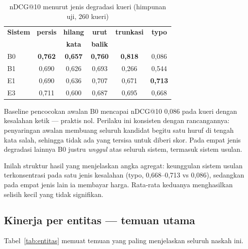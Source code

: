 \documentclass[journal,twoside,web]{ieeecolor}
\begin{document}
\begin{table}[!t]
\caption{nDCG@10 menurut jenis degradasi kueri (himpunan uji, 260 kueri)}
\label{tab:tipe}
\centering
\footnotesize
\begin{tabular}{@{}lccccc@{}}
\toprule
\textbf{Sistem} & \textbf{persis} & \textbf{hilang} & \textbf{urut} &
\textbf{trunkasi} & \textbf{typo} \\
 & & \textbf{kata} & \textbf{balik} & & \\
\midrule
B0 & \textbf{0,762} & \textbf{0,657} & \textbf{0,760} & \textbf{0,818} & 0,086 \\
B1 & 0,690 & 0,626 & 0,693 & 0,266 & 0,544 \\
E1 & 0,690 & 0,636 & 0,707 & 0,671 & \textbf{0,713} \\
E3 & 0,711 & 0,600 & 0,687 & 0,695 & 0,668 \\
\bottomrule
\end{tabular}
\end{table}

Baseline pencocokan awalan B0 mencapai nDCG@10 0,086 pada kueri dengan kesalahan
ketik --- praktis nol. Perilaku ini konsisten dengan rancangannya: penyaringan
awalan membuang seluruh kandidat begitu satu huruf di tengah kata salah, sehingga
tidak ada yang tersisa untuk diberi skor. Pada empat jenis degradasi lainnya B0
justru \emph{unggul} atas seluruh sistem, termasuk sistem usulan.

Inilah struktur hasil yang menjelaskan angka agregat: keunggulan sistem usulan
terkonsentrasi pada satu jenis kesalahan (typo, 0,668--0,713 vs 0,086), sedangkan
pada empat jenis lain ia membayar harga. Rata-rata keduanya menghasilkan selisih
kecil yang tidak signifikan.

\subsection{Kinerja per entitas --- temuan utama}

Tabel~\ref{tab:entitas} memuat temuan yang paling menjelaskan seluruh naskah ini.
\end{document}
